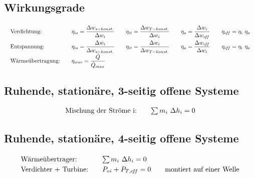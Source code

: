 \subsection{Wirkungsgrade}
%
	\setlength{\abovedisplayskip}{-25pt}
		\[ \arraycolsep=1em \def\arraystretch{2}
		\begin{array}{lllll}
			\text{Verdichtung:}      & \eta_{is} = \dfrac{\Delta w_{s=konst.}}{\Delta w_i} & \eta_{it} = \dfrac{\Delta w_{T=konst.}}{\Delta w_i} & \eta_a    = \dfrac{\Delta w_i}{\Delta w_{\eff}} & \eta_{\eff} = \eta_i \ \eta_a \\
			\text{Entspannung:}      & \eta_{is} = \dfrac{\Delta w_i}{\Delta w_{s=konst.}} & \eta_{it} = \dfrac{\Delta w_i}{\Delta w_{T=konst.}} & \eta_a    = \dfrac{\Delta w_{\eff}}{\Delta w_i} & \eta_{\eff} = \eta_i \ \eta_a \\
			\text{Wärmeübertragung:} & \eta_{wue} = \dfrac{\dot{Q}}{\dot{Q}_{max}}         &                                                     &                                                &
		\end{array} \]

\subsection{Ruhende, stationäre, 3-seitig offene Systeme}
%
	\setlength{\abovedisplayskip}{-15pt}
	\[ \arraycolsep=1em \def\arraystretch{1}
		\setlength{\tabcolsep}{1em} %
		\begin{array}{ll}
			\text{Mischung der Ströme i:} &  \sum m_i\ \Delta h_i = 0
		\end{array} \]

\subsection{Ruhende, stationäre, 4-seitig offene Systeme}
	\setlength{\abovedisplayskip}{-15pt}
	\[ \arraycolsep=1em \def\arraystretch{1.2}
		\begin{array}{lll}
			\text{Wärmeübertrager:}      & \sum m_i\ \Delta h_i = 0 &                                 \\
			\text{Verdichter + Turbine:} & P_{vi} + P_{T,\eff} = 0  & \text{montiert auf einer Welle}
		\end{array} \]


